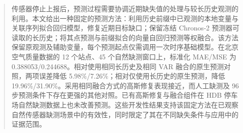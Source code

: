 
\maketitle
\begin{abstract}
传感器停止上报后，预测过程需要协调近期缺失值的处理与较长历史观测的利用。本文给出一种固定的预测方法：利用历史前缀中已观测的本地变量与关联序列拟合回归模型，修复近期目标缺口；保留冻结 Chronos-2 预测器可读取的长历史；将其点预测与前缀拟合的向量自回归预测等权融合。该方法保留原观测及辅助变量，每个预测起点仅需调用一次时序基础模型。在北京空气质量数据的 12 个站点、45 个自然缺测窗口上，标准化 MAE/MSE 为 0.388053/0.244688。相对使用相同长历史及相同 VAR 融合的原生预测对照，两项误差降低 5.98\%/7.26\%；相对仅使用长历史的原生预测，降低 19.96\%/31.90\%。采用相同融合方式的高斯修复表现接近，而人工缺测及 96 步预测条件下存在更强的其他对照。已有高斯修复与融合组件在 HDB 停车场自然缺测数据上也未改善预测。这些开发性结果支持该固定方法在已观察自然传感器缺测场景中的有效性，同时限定了其在不同缺失条件与应用中的证据范围。
\end{abstract}




\appendix


